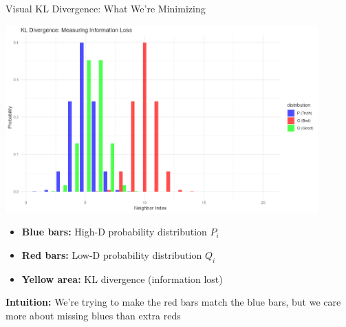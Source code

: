 \documentclass[aspectratio=169]{beamer}
\newcommand{\intuition}[1]{\colorbox{green!10}{\textcolor{intuitioncolor}{\textbf{Intuition:} #1}}}
\begin{document}
\begin{frame}{Visual KL Divergence: What We're Minimizing}
\begin{center}
\includegraphics[width=0.9\textwidth]{./Figures/kl_divergence_visualization.png}
\end{center}

\begin{itemize}
\item \textbf{Blue bars:} High-D probability distribution $P_i$
\item \textbf{Red bars:} Low-D probability distribution $Q_i$
\item \textbf{Yellow area:} KL divergence (information lost)
\end{itemize}

\intuition{We're trying to make the red bars match the blue bars, but we care more about missing blues than extra reds}
\end{frame}
\end{document}
